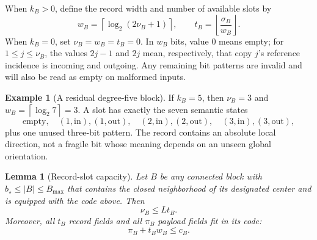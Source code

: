 \documentclass[11pt]{article}
\newtheorem{lemma}[theorem]{Lemma}
\theoremstyle{definition}
\newtheorem{example}[theorem]{Example}
\theoremstyle{remark}
\newcommand{\ceil}[1]{\left\lceil #1\right\rceil}
\newcommand{\floor}[1]{\left\lfloor #1\right\rfloor}
\begin{document}
When $k_B>0$, define the record width and number of available slots by
\[
 w_B=\ceil{\log_2(2\nu_B+1)},\qquad
 t_B=\floor{\frac{\sigma_B}{w_B}}.                             \tag{6.1}
\]
When $k_B=0$, set $\nu_B=w_B=t_B=0$.  In $w_B$ bits, value $0$ means empty;
for $1\le j\le\nu_B$, the values $2j-1$ and $2j$ mean, respectively, that
copy $j$'s reference incidence is incoming and outgoing.  Any remaining bit
patterns are invalid and will also be read as empty on malformed inputs.

\begin{example}[A residual degree-five block]
If $k_B=5$, then $\nu_B=3$ and $w_B=\ceil{\log_2 7}=3$.  A slot has exactly
the seven semantic states
\[
 \text{empty},\quad(1,\mathrm{in}),(1,\mathrm{out}),\quad
 (2,\mathrm{in}),(2,\mathrm{out}),\quad
 (3,\mathrm{in}),(3,\mathrm{out}),
\]
plus one unused three-bit pattern.  The record contains an absolute local
direction, not a fragile bit whose meaning depends on an unseen global
orientation.
\end{example}

\begin{lemma}[Record-slot capacity]
\label{lem:slot-capacity}
Let $B$ be any connected block with
$b_\star\le|B|\le B_{\max}$ that contains the closed neighborhood of its
designated center and is equipped with the code above.  Then
\[
                              \nu_B\le L t_B.                   \tag{6.2}
\]
Moreover, all $t_B$ record fields and all $\pi_B$ payload fields fit in its
code:
\[
                              \pi_B+t_Bw_B\le c_B.              \tag{6.3}
\]
\end{lemma}
\end{document}
